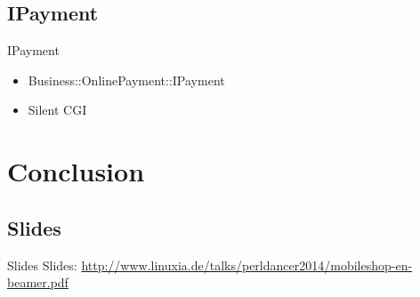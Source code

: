 \subsection{IPayment}
\begin{frame}[fragile]{IPayment}
\begin{itemize}
\item Business::OnlinePayment::IPayment
\item Silent CGI
\end{itemize}
\end{frame}


\section{Conclusion}

\subsection{Slides}

\begin{frame}{Slides}
Slides:
\url{http://www.linuxia.de/talks/perldancer2014/mobileshop-en-beamer.pdf}
\end{frame}




